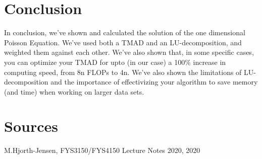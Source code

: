 \documentclass{article}
\begin{document}
\section{Conclusion}
In conclusion, we've shown and calculated the solution of the one dimensional Poisson Equation. We've used both a TMAD and an LU-decomposition, and weighted them against each other. We've also shown that, in some specific cases, you can optimize your TMAD for upto (in our case) a 100\% increase in computing speed, from 8n FLOPs to 4n. We've also shown the limitations of LU-decomposition and the importance of effectivizing your algorithm to save memory (and time) when working on larger data sets.
\section{Sources}
M.Hjorth-Jensen, FYS3150/FYS4150 Lecture Notes 2020, 2020
\end{document}
